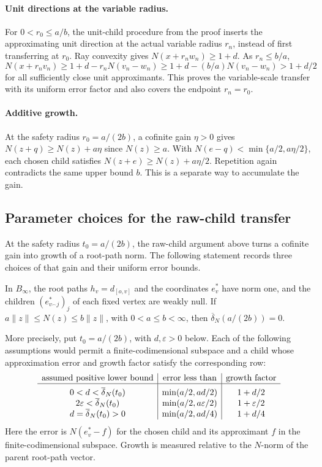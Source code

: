 \paragraph{Unit directions at the variable radius.}
For $0<r_0\le a/b$, the unit-child procedure from the proof inserts the
approximating unit direction at the actual variable radius $r_n$,
instead of first transferring at $r_0$. Ray convexity gives
$N(x+r_nw_n)\ge1+d$. As $r_n\le b/a$,
\begin{equation}\label{binf:variable-radius-transfer}
 N(x+r_nv_n)\ge1+d-r_nN(v_n-w_n)
              \ge1+d-(b/a)N(v_n-w_n)>1+d/2
\end{equation}
for all sufficiently close unit approximants. This proves the
variable-scale transfer with its uniform error factor and also covers
the endpoint $r_n=r_0$.

\paragraph{Additive growth.}
At the safety radius $r_0=a/(2b)$, a cofinite gain $\eta>0$ gives
$N(z+q)\ge N(z)+a\eta$ since $N(z)\ge a$. With
$N(e-q)<\min\{a/2,a\eta/2\}$, each chosen child satisfies
$N(z+e)\ge N(z)+a\eta/2$. Repetition again contradicts the same
upper bound $b$. This is a separate way to accumulate the gain.

\subsection{Parameter choices for the raw-child transfer}

At the safety radius $t_0=a/(2b)$, the raw-child argument above
turns a cofinite gain into growth of a root-path norm. The following
statement records three choices of that gain and their uniform error
bounds.

\begin{proposition}\label{stab:sign:obstruction}
In $B_\infty$, the root paths $h_v=d_{[o,v]}$ and the coordinates
$e_v^*$ have norm one, and the children $(e_{v^\frown j}^*)_j$ of
each fixed vertex are weakly null. If
$a\|z\|\le N(z)\le b\|z\|$, with $0<a\le b<\infty$, then
$\overline\delta_N(a/(2b))=0$.

More precisely, put $t_0=a/(2b)$, with $d,\varepsilon>0$ below.
Each of the following assumptions
would permit a finite-codimensional subspace and a child whose
approximation error and growth factor satisfy the corresponding row:
\[
\begin{array}{c|c|c}
 \text{assumed positive lower bound}&
 \text{error less than}&\text{growth factor}\\\hline
 0<d<\overline\delta_N(t_0)&\min(a/2,ad/2)&1+d/2\rule{0pt}{13pt}\\
 2\varepsilon<\overline\delta_N(t_0)&
       \min(a/2,a\varepsilon/2)&1+\varepsilon/2\\
 d=\overline\delta_N(t_0)>0&\min(a/2,ad/4)&1+d/4
\end{array}
\]
Here the error is $N(e_v^*-f)$ for the chosen child and its
approximant $f$ in the finite-codimensional subspace. Growth is
measured relative to the $N$-norm of the parent root-path vector.
\end{proposition}

